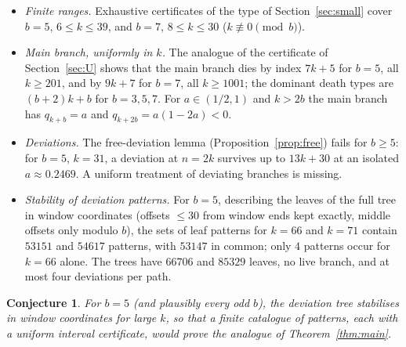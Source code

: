 \documentclass[11pt]{amsart}
\newtheorem{conjecture}[theorem]{Conjecture}
\theoremstyle{definition}
\theoremstyle{remark}
\begin{document}
\begin{itemize}
\item \emph{Finite ranges.} Exhaustive certificates of the type of
Section~\ref{sec:small} cover $b=5$, $6\le k\le 39$, and $b=7$, $8\le k\le 30$
($k\not\equiv 0\pmod b$).
\item \emph{Main branch, uniformly in $k$.} The analogue of the certificate of
Section~\ref{sec:U} shows that the main branch dies by index $7k+5$ for $b=5$, all
$k\ge 201$, and by $9k+7$ for $b=7$, all $k\ge 1001$; the dominant death types are
$(b+2)k+b$ for $b=3,5,7$. For $a\in(1/2,1)$ and $k>2b$ the main branch has
$q_{k+b}=a$ and $q_{k+2b}=a(1-2a)<0$.
\item \emph{Deviations.} The free-deviation lemma (Proposition~\ref{prop:free}) fails
for $b\ge 5$: for $b=5$, $k=31$, a deviation at $n=2k$ survives up to $13k+30$ at an
isolated $a\approx 0.2469$. A uniform treatment of deviating branches is missing.
\item \emph{Stability of deviation patterns.} For $b=5$, describing the leaves of
the full tree in window coordinates (offsets $\le 30$ from window ends kept exactly,
middle offsets only modulo $b$), the sets of leaf patterns for $k=66$ and $k=71$
contain $53151$ and $54617$ patterns, with $53147$ in common; only $4$ patterns occur
for $k=66$ alone. The trees have $66706$ and $85329$ leaves, no live branch, and at
most four deviations per path.
\end{itemize}

\begin{conjecture}
For $b=5$ (and plausibly every odd $b$), the deviation tree stabilises in window
coordinates for large $k$, so that a finite catalogue of patterns, each with a uniform
interval certificate, would prove the analogue of Theorem~\ref{thm:main}.
\end{conjecture}

\raggedright


\end{document}
